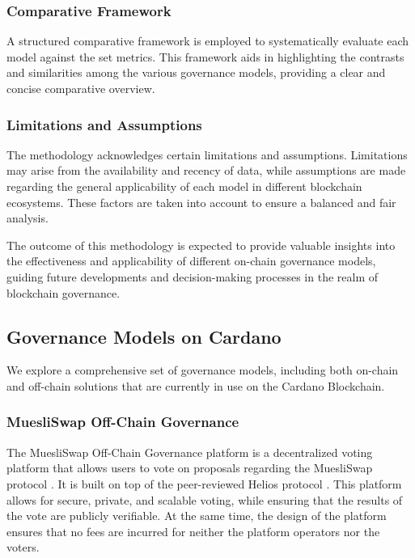 \documentclass[11pt]{article}
\begin{document}
\subsubsection{Comparative Framework}
A structured comparative framework is employed to systematically evaluate each model against the set metrics. This framework aids in highlighting the contrasts and similarities among the various governance models, providing a clear and concise comparative overview.

\subsubsection{Limitations and Assumptions}
The methodology acknowledges certain limitations and assumptions. Limitations may arise from the availability and recency of data, while assumptions are made regarding the general applicability of each model in different blockchain ecosystems. These factors are taken into account to ensure a balanced and fair analysis.

The outcome of this methodology is expected to provide valuable insights into the effectiveness and applicability of different on-chain governance models, guiding future developments and decision-making processes in the realm of blockchain governance.

\subsection{Governance Models on Cardano}

We explore a comprehensive set of governance models, including both on-chain and off-chain solutions
that are currently in use on the Cardano Blockchain.

\subsubsection{MuesliSwap Off-Chain Governance}

The MuesliSwap Off-Chain Governance platform is a decentralized voting platform that allows users to vote on proposals regarding the MuesliSwap protocol \cite{muesliswap-offchain}.
It is built on top of the peer-reviewed Helios protocol \cite{DBLP:conf/uss/Adida08}.
This platform allows for secure, private, and scalable voting, while ensuring that the results of the vote are publicly verifiable.
At the same time, the design of the platform ensures that no fees are incurred for neither the platform operators nor the voters.
\end{document}
